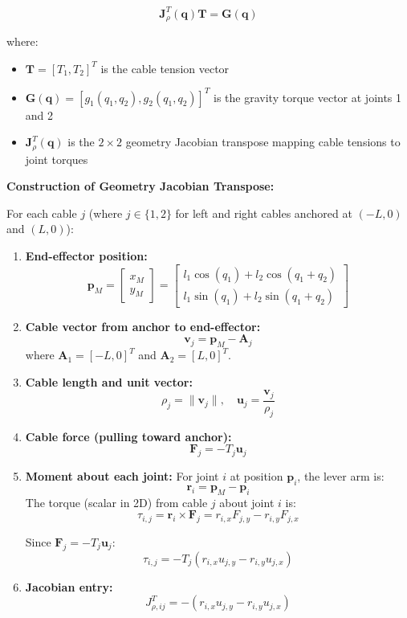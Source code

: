 $$\mathbf{J}_{\rho}^T(\mathbf{q}) \mathbf{T} = \mathbf{G}(\mathbf{q})$$

where:
\begin{itemize}
    \item $\mathbf{T} = [T_1, T_2]^T$ is the cable tension vector
    \item $\mathbf{G}(\mathbf{q}) = [g_1(q_1, q_2), g_2(q_1, q_2)]^T$ is the gravity torque vector at joints 1 and 2
    \item $\mathbf{J}_{\rho}^T(\mathbf{q})$ is the $2 \times 2$ geometry Jacobian transpose mapping cable tensions to joint torques
\end{itemize}

\textbf{Construction of Geometry Jacobian Transpose:}

For each cable $j$ (where $j \in \{1,2\}$ for left and right cables anchored at $(-L, 0)$ and $(L, 0)$):

\begin{enumerate}
    \item \textbf{End-effector position:}
    $$\mathbf{p}_M = \begin{bmatrix} x_M \\ y_M \end{bmatrix} = \begin{bmatrix} l_1 \cos(q_1) + l_2 \cos(q_1 + q_2) \\ l_1 \sin(q_1) + l_2 \sin(q_1 + q_2) \end{bmatrix}$$
    
    \item \textbf{Cable vector from anchor to end-effector:}
    $$\mathbf{v}_j = \mathbf{p}_M - \mathbf{A}_j$$
    where $\mathbf{A}_1 = [-L, 0]^T$ and $\mathbf{A}_2 = [L, 0]^T$.
    
    \item \textbf{Cable length and unit vector:}
    $$\rho_j = \|\mathbf{v}_j\|, \quad \mathbf{u}_j = \frac{\mathbf{v}_j}{\rho_j}$$
    
    \item \textbf{Cable force (pulling toward anchor):}
    $$\mathbf{F}_j = -T_j \mathbf{u}_j$$
    
    \item \textbf{Moment about each joint:} For joint $i$ at position $\mathbf{p}_i$, the lever arm is:
    $$\mathbf{r}_i = \mathbf{p}_M - \mathbf{p}_i$$
    The torque (scalar in 2D) from cable $j$ about joint $i$ is:
    $$\tau_{i,j} = \mathbf{r}_i \times \mathbf{F}_j = r_{i,x} F_{j,y} - r_{i,y} F_{j,x}$$
    
    Since $\mathbf{F}_j = -T_j \mathbf{u}_j$:
    $$\tau_{i,j} = -T_j (r_{i,x} u_{j,y} - r_{i,y} u_{j,x})$$
    
    \item \textbf{Jacobian entry:}
    $$J_{\rho,ij}^T = -(r_{i,x} u_{j,y} - r_{i,y} u_{j,x})$$
\end{enumerate}

